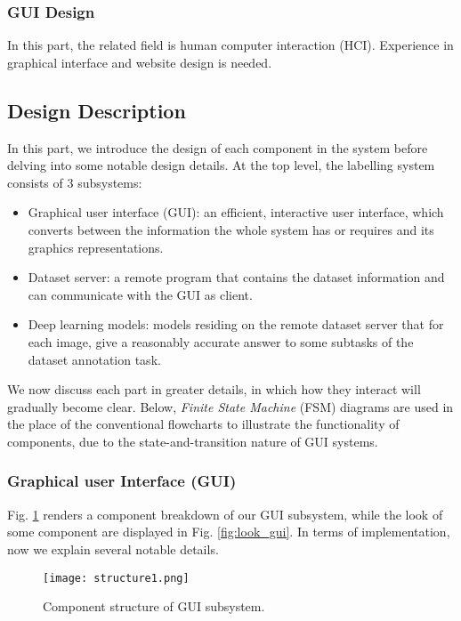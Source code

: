 \subsubsection{GUI Design}
In this part, the related field is human computer interaction (HCI). Experience
in graphical interface and website design is needed.

\subsection{Design Description}

In this part, we introduce the design of each component in the system before
delving into some notable design details. At the top level, the labelling
system consists of 3 subsystems:
\begin{itemize}
    \item Graphical user interface (GUI): an efficient, interactive user
interface, which converts between the information the whole system has or
requires and its graphics representations.
    \item Dataset server: a remote program that contains the dataset
information and can communicate with the GUI as client.
    \item Deep learning models: models residing on the remote dataset server
that for each image, give a reasonably accurate answer to some subtasks of the
dataset annotation task.
\end{itemize}

We now discuss each part in greater details, in which how they interact will
gradually become clear. Below, \textit{Finite State Machine} (FSM) diagrams are
used in the place of the conventional flowcharts to illustrate the
functionality of components, due to the state-and-transition nature of GUI
systems.

\subsubsection{Graphical user Interface (GUI)}
\label{sec:gui}

Fig. \ref{fig:structure_gui} renders a component breakdown of our GUI
subsystem, while the look of some component are displayed in Fig.
\ref{fig:look_gui}. In terms of implementation, now we explain several notable
details.

\begin{figure}[htbp!]
    \centering
    \texttt{[image: structure1.png]}
    \caption{Component structure of GUI subsystem.}
    \label{fig:structure_gui}
\end{figure}


